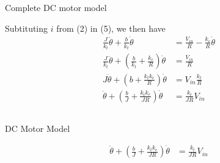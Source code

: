 \subsection{}
{
\begin{frame}{Complete DC motor model}

Subtituting $i$ from (2) in (5), we then have
\begin{equation}
\begin{split}
\frac{J}{k_t} \ddot{ \theta} + \frac{b}{k_t} \dot \theta & = \frac{V_{in}}{R} - \frac{k_e}{R} \dot \theta \\
\frac{J}{k_t} \ddot{ \theta} + (\frac{b}{k_t}  + \frac{k_e}{R} ) \dot \theta & = \frac{V_{in}}{R} \\
J \ddot{ \theta} + (b + \frac{ k_t k_e }{R} ) \dot \theta & = V_{in} \frac{k_t}{R} \\
\ddot{ \theta} + (\frac{b}{J} + \frac{ k_t k_e }{JR} ) \dot \theta & = \frac{k_t}{JR} V_{in}
\end{split}
\end{equation}




\end{frame}
}




\subsection{}
{
\begin{frame}{DC Motor Model}

	\vspace{-3mm}
   	\begin{figure}
 	\end{figure}

\begin{equation*}
\begin{split}
\ddot{ \theta} + (\frac{b}{J} + \frac{ k_t k_e }{JR} ) \dot \theta & = \frac{k_t}{JR} V_{in}
\end{split}
\end{equation*}



\end{frame}
}



